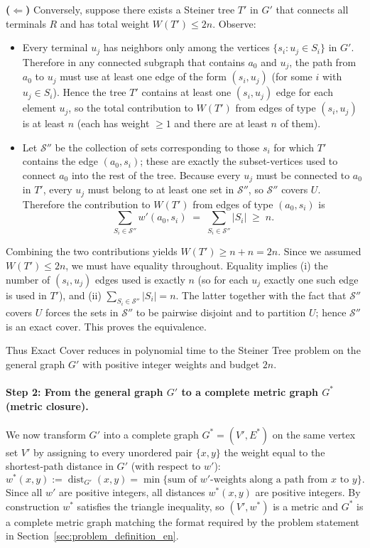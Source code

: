 \documentclass{article}
\begin{document}
\textbf{($\Leftarrow$)} Conversely, suppose there exists a Steiner tree $T'$ in $G'$ that connects all terminals $R$ and has total weight $W(T')\le 2n$. Observe:
\begin{itemize}
    \item Every terminal $u_j$ has neighbors only among the vertices $\{s_i : u_j\in S_i\}$ in $G'$. Therefore in any connected subgraph that contains $a_0$ and $u_j$, the path from $a_0$ to $u_j$ must use at least one edge of the form $(s_i,u_j)$ (for some $i$ with $u_j\in S_i$). Hence the tree $T'$ contains at least one $(s_i,u_j)$ edge for each element $u_j$, so the total contribution to $W(T')$ from edges of type $(s_i,u_j)$ is at least $n$ (each has weight $\ge 1$ and there are at least $n$ of them).
    \item Let $\mathcal S''$ be the collection of sets corresponding to those $s_i$ for which $T'$ contains the edge $(a_0,s_i)$; these are exactly the subset-vertices used to connect $a_0$ into the rest of the tree. Because every $u_j$ must be connected to $a_0$ in $T'$, every $u_j$ must belong to at least one set in $\mathcal S''$, so $\mathcal S''$ covers $U$. Therefore the contribution to $W(T')$ from edges of type $(a_0,s_i)$ is
    \[
      \sum_{S_i\in\mathcal S''} w'(a_0,s_i)
      \;=\;\sum_{S_i\in\mathcal S''} |S_i|
      \;\ge\; n.
    \]
\end{itemize}
Combining the two contributions yields \(W(T') \ge n + n = 2n\). Since we assumed \(W(T')\le 2n\), we must have equality throughout. Equality implies (i) the number of $(s_i,u_j)$ edges used is exactly $n$ (so for each $u_j$ exactly one such edge is used in $T'$), and (ii) \(\sum_{S_i\in\mathcal S''}|S_i|=n\). The latter together with the fact that $\mathcal S''$ covers $U$ forces the sets in $\mathcal S''$ to be pairwise disjoint and to partition $U$; hence $\mathcal S''$ is an exact cover. This proves the equivalence.

Thus Exact Cover reduces in polynomial time to the Steiner Tree problem on the general graph $G'$ with positive integer weights and budget $2n$.

\paragraph{Step 2: From the general graph $G'$ to a complete metric graph $G^*$ (metric closure).}
We now transform $G'$ into a complete graph $G^*=(V',E^*)$ on the same vertex set $V'$ by assigning to every unordered pair $\{x,y\}$ the weight equal to the shortest-path distance in $G'$ (with respect to $w'$):
\[
  w^*(x,y):=\operatorname{dist}_{G'}(x,y)=\min\{\text{sum of }w'\text{-weights along a path from }x\text{ to }y\}.
\]
Since all $w'$ are positive integers, all distances $w^*(x,y)$ are positive integers. By construction $w^*$ satisfies the triangle inequality, so $(V',w^*)$ is a metric and $G^*$ is a complete metric graph matching the format required by the problem statement in Section~\ref{sec:problem_definition_en}.
\end{document}
